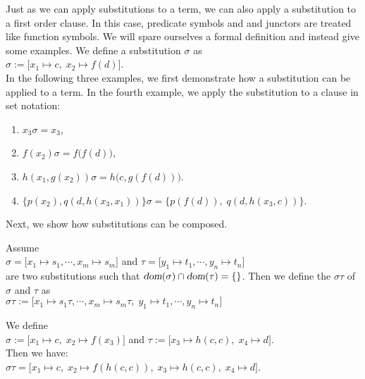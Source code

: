 Just as we can apply substitutions to a term, we can also apply a substitution
to a first order clause.  In this case, predicate symbols and
and junctors are treated like function symbols.
We will spare ourselves a formal definition and instead give some examples. 
We define a substitution $\sigma$ as \\[0.2cm]
\hspace*{1.3cm} $\sigma := \big[ x_1 \mapsto c,\; x_2 \mapsto f(d) \big]$. \\[0.2cm]
In the following three examples, we first demonstrate how a substitution
can be applied to a term.  In the fourth example, we apply the substitution
to a clause in set notation:
\begin{enumerate}
\item $x_3\sigma = x_3$,
\item $f(x_2)\sigma = f\bigl(f(d)\bigr)$,
\item $h(x_1,g(x_2))\sigma = h\bigl(c,g(f(d))\bigr)$.
\item $\bigl\{ p(x_2), q(d,h(x_3,x_1))\bigr\}\sigma = \bigl\{ p(f(d)),\; q(d,h(x_3,c))\bigr\}$.
\end{enumerate}

\noindent
Next, we show how substitutions can be composed.
\begin{Definition} 
    Assume \\[0.2cm]
    \hspace*{1.3cm} $\sigma = \big[ x_1 \mapsto s_1, \cdots, x_m \mapsto s_m \big]$ \quad and \quad $\tau = \big[ y_1 \mapsto t_1, \cdots, y_n \mapsto t_n \big]$ \\[0.2cm]
    are two substitutions such that $\textsl{dom}(\sigma) \cap \textsl{dom}(\tau) = \{\}$. Then 
    we define the  $\sigma\tau$ \index{$\sigma\tau$} of  $\sigma$ and $\tau$ as \\[0.2cm]
    \hspace*{1.3cm} $\sigma\tau := \big[ x_1 \mapsto s_1\tau, \cdots, x_m \mapsto s_m\tau,\; y_1 \mapsto t_1, \cdots, y_n \mapsto t_n \big]$
    \eox
\end{Definition}

\exampleEng
We define \\[0.2cm]
\hspace*{1.3cm} $\sigma := \big[ x_1 \mapsto c,\; x_2 \mapsto f(x_3) \big]$
                \quad and \quad $\tau := \big[ x_3 \mapsto h(c,c),\; x_4 \mapsto d \big]$. \\[0.2cm]
Then we have: \\[0.2cm]
\hspace*{1.3cm} $ \sigma\tau = \big[ x_1 \mapsto c,\; x_2 \mapsto f(h(c,c)),\; x_3 \mapsto h(c,c),\;x_4 \mapsto d \big]$.
\eox

